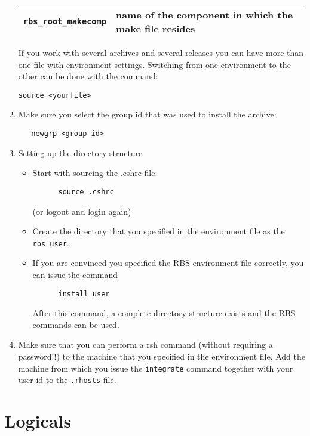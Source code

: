\begin{enumerate}
\begin{tabular}{|l|p{5cm}|}
\verb+rbs_root_makecomp+   & name of the component in which the  make file resides \\ \hline
\end{tabular}
If you work with several archives and several releases you can have more than
one file with environment settings. Switching from one environment
to the other can be done with the command:
\begin{verbatim}
source <yourfile>
\end{verbatim}
\item Make sure you select the group id that was used to install the archive:
\begin{verbatim}
   newgrp <group id>
\end{verbatim}
\item Setting up the directory structure
   \begin{itemize}
   \item Start with sourcing the .cshrc file:
\begin{verbatim}
      source .cshrc
\end{verbatim}
      (or logout and login again)

   \item Create the directory that you specified in the environment file as the
      \verb+rbs_user+.

   \item If you are convinced you specified the RBS environment file correctly, 
      you can issue the command
\begin{verbatim}
      install_user
\end{verbatim}
      After this command, a complete directory structure exists and the RBS
      commands can be used.
   \end{itemize}
\item Make sure that you can perform a rsh command (without requiring a password!!)
   to the machine that you specified in the environment file. Add the machine
   from which you issue the \verb+integrate+ command together with your
   user id to the \verb+.rhosts+ file.
\end{enumerate}


\section{Logicals}

